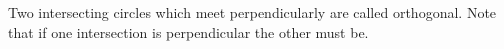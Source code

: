  Two intersecting circles which meet perpendicularly are called
orthogonal. Note that if one intersection is perpendicular the
other must be.
